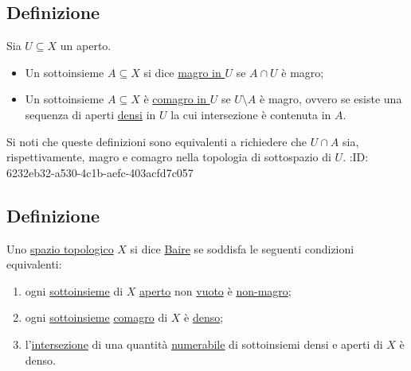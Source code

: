 \documentclass{article}
\newcommand{\1}{\mathds{1}}
\begin{document}
\subsection{Definizione}
\label{sec:org5fa9f27}

Sia \(U \subseteq X\) un aperto.
\begin{itemize}
\item Un sottoinsieme \(A \subseteq X\) si dice \uline{magro in \(U\)} se \(A\cap U\) è magro;
\item Un sottoinsieme \(A \subseteq X\) è \uline{comagro in \(U\)} se \(U\setminus A\) è magro, ovvero se esiste una sequenza di aperti \href{../../../../../../../org/roam/20250301193045-sottoinsieme_denso.org}{densi} in \(U\) la cui intersezione è contenuta in \(A\).
\end{itemize}

Si noti che queste definizioni sono equivalenti a richiedere che \(U\cap A\) sia, rispettivamente, magro e comagro nella topologia di sottospazio di \(U\).
:ID:       6232eb32-a530-4c1b-aefc-403acfd7c057
\subsection{Definizione}
\label{sec:org463bb52}

Uno \href{../../../../../../../org/roam/20250103145124-topologia.org}{spazio topologico} \(X\) si dice \uline{Baire} se soddisfa le seguenti condizioni equivalenti:
\begin{enumerate}
\item ogni \href{../../../../../../../org/roam/20250131155822-operazioni_insiemistiche_tra_classi_mk.org}{sottoinsieme} di \(X\) \href{../../../../../../../org/roam/20250103145124-topologia.org}{aperto} non \href{../../../../../../../org/roam/20250131161811-insieme_vuoto_mk.org}{vuoto} è \href{../../../../../../../org/roam/20250419122752-insieme_magro.org}{non-magro};
\item ogni \href{../../../../../../../org/roam/20250131155822-operazioni_insiemistiche_tra_classi_mk.org}{sottoinsieme} \href{../../../../../../../org/roam/20250419122752-insieme_magro.org}{comagro} di \(X\) è \href{../../../../../../../org/roam/20250301193045-sottoinsieme_denso.org}{denso};
\item l'\href{../../../../../../../org/roam/20250131183141-classe_intersezione.org}{intersezione} di una quantità \href{../../../../../../../org/roam/20250111143651-insieme_numerabile.org}{numerabile} di sottoinsiemi densi e aperti di \(X\) è denso.
\end{enumerate}
\end{document}
